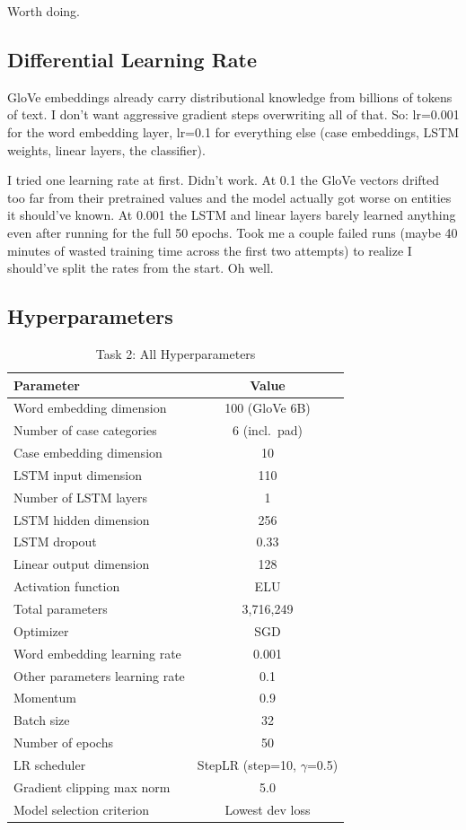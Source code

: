 \documentclass[11pt]{article}
\begin{document}
Worth doing.

\subsection{Differential Learning Rate}

GloVe embeddings already carry distributional knowledge from billions of tokens of text. I don't want aggressive gradient steps overwriting all of that. So: lr=0.001 for the word embedding layer, lr=0.1 for everything else (case embeddings, LSTM weights, linear layers, the classifier).

I tried one learning rate at first. Didn't work. At 0.1 the GloVe vectors drifted too far from their pretrained values and the model actually got worse on entities it should've known. At 0.001 the LSTM and linear layers barely learned anything even after running for the full 50 epochs. Took me a couple failed runs (maybe 40 minutes of wasted training time across the first two attempts) to realize I should've split the rates from the start. Oh well.

\subsection{Hyperparameters}

\begin{table}[h]
\centering
\caption{Task 2: All Hyperparameters}
\label{tab:hp2}
\begin{tabular}{lc}
\toprule
\textbf{Parameter} & \textbf{Value} \\
\midrule
Word embedding dimension & 100 (GloVe 6B) \\
Number of case categories & 6 (incl.\ pad) \\
Case embedding dimension & 10 \\
LSTM input dimension & 110 \\
Number of LSTM layers & 1 \\
LSTM hidden dimension & 256 \\
LSTM dropout & 0.33 \\
Linear output dimension & 128 \\
Activation function & ELU \\
Total parameters & 3,716,249 \\
\midrule
Optimizer & SGD \\
Word embedding learning rate & 0.001 \\
Other parameters learning rate & 0.1 \\
Momentum & 0.9 \\
Batch size & 32 \\
Number of epochs & 50 \\
LR scheduler & StepLR (step=10, $\gamma$=0.5) \\
Gradient clipping max norm & 5.0 \\
Model selection criterion & Lowest dev loss \\
\bottomrule
\end{tabular}
\end{table}
\end{document}
